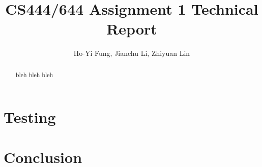 \documentclass[notitlepage]{report}
\title{CS444/644 Assignment 1 Technical Report}
\author{Ho-Yi Fung, Jianchu Li, Zhiyuan Lin}
\date{}
\begin{document}
{\let\newpage\relax\maketitle}
\begin{abstract}
bleh bleh bleh
\end{abstract}


\tableofcontents









\chapter{Testing}


\chapter{Conclusion}



\end{document}
